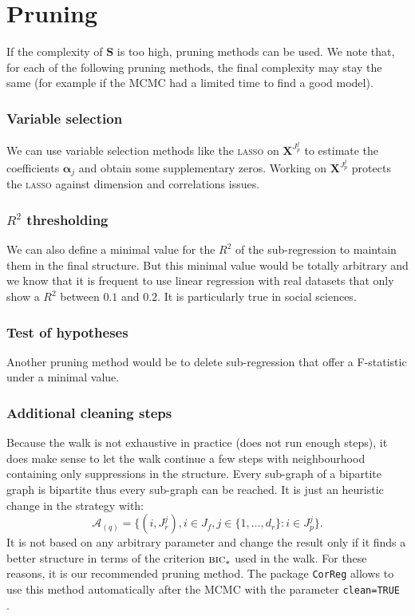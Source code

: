 \documentclass[12pt,a4paper]{report}
\begin{document}
	\section{Pruning}
		If the complexity of $\boldsymbol{S}$ is too high, pruning methods can be used. We note that, for each of the following pruning methods, the final complexity may stay the same (for example if the MCMC had a limited time to find a good model).
		\subsubsection{Variable selection}
			We can use variable selection methods like the \textsc{lasso} on $\boldsymbol{X}^{J_p^j}$ to estimate the coefficients $\boldsymbol{\alpha}_j$ and obtain some supplementary zeros. Working on $\boldsymbol{X}^{J_p^j}$ protects the \textsc{lasso} against dimension and correlations issues.
		\subsubsection{$R^2$ thresholding }
			We can also define a minimal value for the $R^2$ of the sub-regression to maintain them in the final structure. But this minimal value would be totally arbitrary and we know that it is frequent to use linear regression with real datasets that only show a $R^2$ between $0.1$ and $0.2$. It is particularly true in social sciences.
		\subsubsection{Test of hypotheses}
			Another pruning method would be to delete sub-regression that offer a F-statistic under a minimal value.
		\subsubsection{Additional cleaning steps}
			Because the walk is not exhaustive in practice (does not run enough steps), it does make sense to let the walk continue a few steps with neighbourhood containing only suppressions in the structure. Every sub-graph of a bipartite graph is bipartite thus every sub-graph can be reached. It is just an heuristic change in the strategy with:
			\begin{equation}
				\mathcal{A}_{(q)}=\{(i,J_r^j), i \in J_f, j \in \{1,\dots,d_r \}: i \in J_p^j \}.
			\end{equation}
			It is not based on any arbitrary parameter and change the result only if it finds a better structure in terms of the criterion $\mbox{{\sc bic}}_*$ used in the walk.
			For these reasons, it is our recommended pruning method. The package {\tt CorReg} allows to use this method automatically after the MCMC with the parameter {\tt clean=TRUE }.
			
\end{document}
